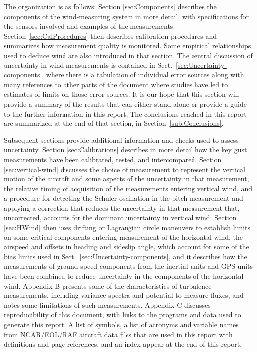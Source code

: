 \documentclass[12pt,twoside,english]{article}\usepackage[]{graphicx}\usepackage[]{color}
\let\OrgIndex\index
\renewcommand*{\index}[1]{\OrgIndex{#1}}
\begin{document}
The organization is as follows: Section \ref{sec:Components} describes the components of the wind-measuring system in more detail, with specifications for the sensors involved and examples of the measurements. Section~\ref{sec:CalProcedures} then describes calibration procedures and summarizes how measurement quality is monitored. Some empirical relationships used to deduce wind are also introduced in that section. The central discussion of uncertainty in wind measurements is contained in Sect.~\ref{sec:Uncertainty-components}, where there is a tabulation of individual error sources along with many references to other parts of the document where studies have led to estimates of limits on those error sources. It is our hope that this section will provide a summary of the results that can either stand alone or provide a guide to the further information in this report. The conclusions reached in this report are summarized at the end of that section, in Section~\ref{sub:Conclusions}.

Subsequent sections provide additional information and checks used to assess uncertainty. Section \ref{sec:Calibrations} describes in more detail how the key gust measurements have been calibrated, tested, and intercompared. Section \ref{sec:vertical-wind} discusses the choice of measurement to represent the vertical motion of the aircraft and some aspects of the uncertainty in that measurement, the relative timing of acquisition of the measurements entering vertical wind, and a procedure for detecting the Schuler oscillation in the pitch measurement and applying a correction that reduces the uncertainty in that measurement that, uncorrected, accounts for the dominant uncertainty in vertical wind. Section \ref{sec:HWind} then uses drifting or Lagrangian circle maneuvers to establish limits on some critical components entering measurement of the horizontal wind, the airspeed and offsets in heading and sideslip angle, which account for some of the bias limits used in Sect.~\ref{sec:Uncertainty-components}, and it describes how the measurements of ground-speed components from the inertial units and GPS units have been combined to reduce uncertainty in the components of the horizontal wind. Appendix B presents some of the characteristics of turbulence measurements, including variance spectra and potential to measure fluxes, and notes some limitations of such measurements. Appendix C discusses reproducibility of this document, with links to the programs and data used to generate this report. A list of symbols, a list of acronyms and variable names from NCAR/EOL/RAF aircraft data files that are used in this report with definitions and page references, and an index appear at the end of this report.
\end{document}
